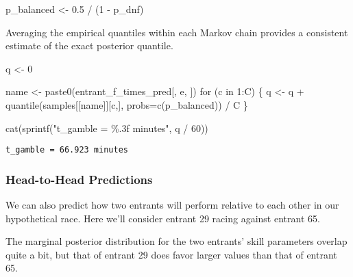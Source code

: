 \documentclass[
  letterpaper,
  DIV=11,
  numbers=noendperiod]{scrartcl}
\newenvironment{Shaded}{\begin{snugshade}}{\end{snugshade}}
\newcommand{\AttributeTok}[1]{\textcolor[rgb]{0.40,0.45,0.13}{#1}}
\newcommand{\ControlFlowTok}[1]{\textcolor[rgb]{0.00,0.23,0.31}{#1}}
\newcommand{\DecValTok}[1]{\textcolor[rgb]{0.68,0.00,0.00}{#1}}
\newcommand{\FloatTok}[1]{\textcolor[rgb]{0.68,0.00,0.00}{#1}}
\newcommand{\FunctionTok}[1]{\textcolor[rgb]{0.28,0.35,0.67}{#1}}
\newcommand{\NormalTok}[1]{\textcolor[rgb]{0.00,0.23,0.31}{#1}}
\newcommand{\OtherTok}[1]{\textcolor[rgb]{0.00,0.23,0.31}{#1}}
\newcommand{\SpecialCharTok}[1]{\textcolor[rgb]{0.37,0.37,0.37}{#1}}
\newcommand{\StringTok}[1]{\textcolor[rgb]{0.13,0.47,0.30}{#1}}
\begin{document}
\begin{Shaded}
\begin{Highlighting}[]
\NormalTok{p\_balanced }\OtherTok{\textless{}{-}} \FloatTok{0.5} \SpecialCharTok{/}\NormalTok{ (}\DecValTok{1} \SpecialCharTok{{-}}\NormalTok{ p\_dnf)}
\end{Highlighting}
\end{Shaded}

Averaging the empirical quantiles within each Markov chain provides a
consistent estimate of the exact posterior quantile.

\begin{Shaded}
\begin{Highlighting}[]
\NormalTok{q }\OtherTok{\textless{}{-}} \DecValTok{0}

\NormalTok{name }\OtherTok{\textless{}{-}} \FunctionTok{paste0}\NormalTok{(}\StringTok{\textquotesingle{}entrant\_f\_times\_pred[\textquotesingle{}}\NormalTok{, e, }\StringTok{\textquotesingle{}]\textquotesingle{}}\NormalTok{)}
\ControlFlowTok{for}\NormalTok{ (c }\ControlFlowTok{in} \DecValTok{1}\SpecialCharTok{:}\NormalTok{C) \{}
\NormalTok{  q }\OtherTok{\textless{}{-}}\NormalTok{ q }\SpecialCharTok{+} \FunctionTok{quantile}\NormalTok{(samples[[name]][c,], }\AttributeTok{probs=}\FunctionTok{c}\NormalTok{(p\_balanced)) }\SpecialCharTok{/}\NormalTok{ C}
\NormalTok{\}}

\FunctionTok{cat}\NormalTok{(}\FunctionTok{sprintf}\NormalTok{(}\StringTok{"t\_gamble = \%.3f minutes"}\NormalTok{, q }\SpecialCharTok{/} \DecValTok{60}\NormalTok{))}
\end{Highlighting}
\end{Shaded}

\begin{verbatim}
t_gamble = 66.923 minutes
\end{verbatim}

\subsubsection{Head-to-Head Predictions}\label{head-to-head-predictions}

We can also predict how two entrants will perform relative to each other
in our hypothetical race. Here we'll consider entrant 29 racing against
entrant 65.

The marginal posterior distribution for the two entrants' skill
parameters overlap quite a bit, but that of entrant 29 does favor larger
values than that of entrant 65.
\end{document}
